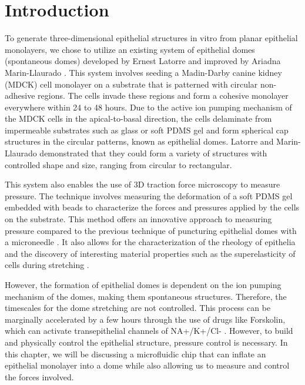 \hypertarget{introduction}{%
\section{Introduction}\label{introduction1}}

To generate three-dimensional epithelial structures in vitro from planar epithelial monolayers, we chose to utilize an existing system of epithelial domes (spontaneous domes) developed by Ernest Latorre and improved by Ariadna Marin-Llaurado \cite{latorre2018,marin-llaurado2022}. This system involves seeding a Madin-Darby canine kidney (MDCK) cell monolayer on a substrate that is patterned with circular non-adhesive regions. The cells invade these regions and form a cohesive monolayer everywhere within 24 to 48 hours. Due to the active ion pumping mechanism of the MDCK cells in the apical-to-basal direction, the cells delaminate from impermeable substrates such as glass or soft PDMS gel and form spherical cap structures in the circular patterns, known as epithelial domes. Latorre and Marin-Llaurado demonstrated that they could form a variety of structures with controlled shape and size, ranging from circular to rectangular.  

This system also enables the use of 3D traction force microscopy to measure pressure. The technique involves measuring the deformation of a soft PDMS gel embedded with beads to characterize the forces and pressures applied by the cells on the substrate. This method offers an innovative approach to measuring pressure compared to the previous technique of puncturing epithelial domes with a microneedle \cite{tanner1983, choudhury2022}. It also allows for the characterization of the rheology of epithelia and the discovery of interesting material properties such as the superelasticity of cells during stretching \cite{latorre2018}.  

However, the formation of epithelial domes is dependent on the ion pumping mechanism of the domes, making them spontaneous structures. Therefore, the timescales for the dome stretching are not controlled. This process can be marginally accelerated by a few hours through the use of drugs like Forskolin, which can activate transepithelial channels of NA+/K+/Cl-  \cite{klebe1995,bourke1987}. However, to build and physically control the epithelial structure, pressure control is necessary. In this chapter, we will be discussing a microfluidic chip that can inflate an epithelial monolayer into a dome while also allowing us to measure and control the forces involved.


